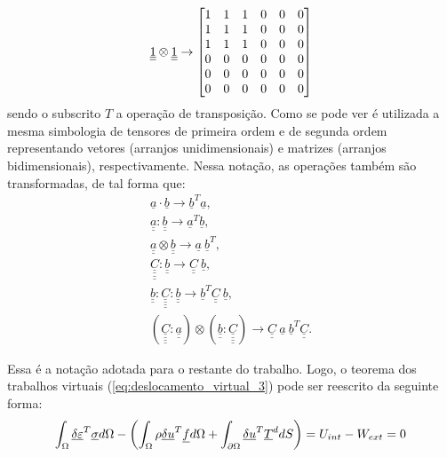 \begin{equation}
	\label{eq:UmllotimesUll}
	\underline{\underline 1} \otimes \underline{\underline 1} \rightarrow  
	\begin{bmatrix}
		1 & 1 & 1 & 0 & 0 & 0 \\
		1 & 1 & 1 & 0 & 0 & 0  \\
		1 & 1 & 1 & 0 & 0 & 0  \\
		0 & 0 & 0 & 0 & 0 & 0  \\
		0 & 0 & 0 & 0 & 0 & 0  \\
		0 & 0 & 0 & 0 & 0 & 0 
	\end{bmatrix}
\end{equation}
sendo o subscrito $T$ a operação de transposição. Como se pode ver é utilizada a mesma simbologia de tensores de primeira ordem e de segunda ordem representando vetores (arranjos unidimensionais) e matrizes (arranjos bidimensionais), respectivamente. Nessa notação, as operações também são transformadas, de tal forma que:
\begin{equation}
	\label{eq:operacoes_voigt}
	\begin{array}{lcl}
		\underline{a} \cdot \underline{b} \rightarrow \underline{b}^T \underline{a}, \\ 
		\underline{\underline{a}} : \underline{\underline{b}} \rightarrow \underline{a}^T \underline{b}, \\ 
		\underline{\underline a} \otimes \underline{\underline b} \rightarrow \underline a ~ \underline b ^T, \\ 
		\underline{\underline{\underline{\underline{C}}}} : \underline{\underline{b}} \rightarrow \underline{\underline C} ~ \underline b, \\ 
		\underline{\underline{b}}:\underline{\underline{\underline{\underline{C}}}} : \underline{\underline{b}} \rightarrow \underline {b}^T \underline{\underline{C}} ~ \underline{b}, \\ 
		\left( 	\underline{\underline{\underline{\underline{C}}}}:\underline{\underline{a}} \right) \otimes \left( \underline{\underline{b}} :	\underline{\underline{\underline{\underline{C}}}} \right) \rightarrow \underline{\underline{C}}~ \underline{a}~\underline{b}^T \underline{\underline{C}}.
	\end{array}
\end{equation}

Essa é a notação adotada para o restante do trabalho. Logo, o teorema dos trabalhos virtuais (\ref{eq:deslocamento_virtual_3}) pode ser reescrito da seguinte forma:
\begin{equation}
	\label{eq:deslocamento_virtual_3}
	\int_{\Omega} \underline{\delta \varepsilon}^T \underline \sigma d\Omega - \left(\int_{\Omega} \rho \underline {\delta u}^T \underline f d\Omega + \int_{\partial \Omega} \underline {\delta u}^T \underline T^d dS \right) = U_{int} - W_{ext} = 0
\end{equation}
